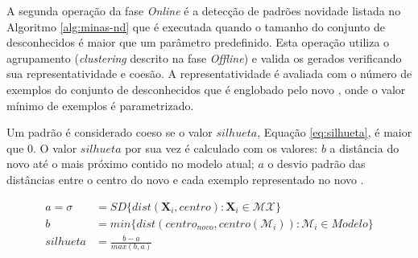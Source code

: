 A segunda operação da fase \emph{Online} é a detecção de padrões novidade
listada no Algoritmo \ref{alg:minas-nd} que é executada quando o tamanho do
conjunto de desconhecidos é maior que um parâmetro predefinido.
Esta operação utiliza o agrupamento (\emph{clustering} descrito na fase
\emph{Offline}) e valida os \mclusters gerados verificando sua
representatividade e coesão.
A representatividade é avaliada com o número de exemplos do conjunto de
desconhecidos que é englobado pelo novo \mcluster, onde o valor mínimo de
exemplos é parametrizado.

Um padrão é considerado coeso se o valor $\mathit{silhueta}$, Equação
\ref{eq:silhueta}, é maior que $0$.
O valor $\mathit{silhueta}$ por sua vez é calculado com os valores:
$b$ a distância do novo \mcluster até o mais próximo contido no modelo atual;
$a$ o desvio padrão das distâncias entre o centro do novo \mcluster e cada
exemplo representado no novo \mcluster.

\begin{align}
  a = \sigma &= \mathit{SD}\{ dist(\mathbf{X}_i, centro) : \mathbf{X}_i \in \mathcal{MX} \} \nonumber\\
  b &= min\{ dist( centro_{novo}, centro(\mathcal{M}_i)) : \mathcal{M}_i \in {Modelo}\}\nonumber\\
  \mathit{silhueta} &= \frac{b - a}{max(b, a)} \label{eq:silhueta}
\end{align}


